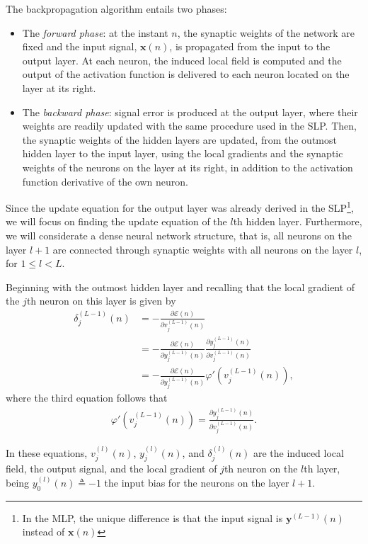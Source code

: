 \documentclass[12pt,a4paper]{article}
\begin{document}
The backpropagation algorithm entails two phases:
\begin{itemize}
    \item The \emph{forward phase}: at the instant \(n\), the synaptic weights of the network are fixed and the input signal, \(\mathbf{x}(n)\), is propagated from the input to the output layer. At each neuron, the induced local field is computed and the output of the activation function is delivered to each neuron located on the layer at its right.
    \item The \emph{backward phase}: signal error is produced at the output layer, where their weights are readily updated with the same procedure used in the SLP. Then, the synaptic weights of the hidden layers are updated, from the outmost hidden layer to the input layer, using the local gradients and the synaptic weights of the neurons on the layer at its right, in addition to the activation function derivative of the own neuron. 
\end{itemize}

Since the update equation for the output layer was already derived in the SLP\footnote{In the MLP, the unique difference is that the input signal is \(\mathbf{y}^{(L-1)}(n)\) instead of \(\mathbf{x}(n)\)}, we will focus on finding the update equation of the \(l\)th hidden layer. Furthermore, we will considerate a dense neural network structure, that is, all neurons on the layer \(l+1\) are connected through synaptic weights with all neurons on the layer \(l\), for \(1\leq l < L\).

Beginning with the outmost hidden layer and recalling that the local gradient of the \(j\)th neuron on this layer is given by
\begin{align}
    \delta_j^{(L-1)} (n) & = - \frac{\partial \mathscr{E}(n)}{\partial v_{j}^{(L-1)}(n)} \nonumber \\
    & = - \frac{\partial \mathscr{E}(n)}{\partial y_{j}^{(L-1)}(n)} \frac{\partial y_{j}^{(L-1)}(n)}{\partial v_{j}^{(L-1)}(n)} \nonumber \nonumber \\
    & = - \frac{\partial \mathscr{E}(n)}{\partial y_{j}^{(L-1)}(n)} \varphi'(v_j^{(L-1)}(n)),
    \label{eq:local-gradient2}
\end{align}
where the third equation follows that
\begin{align}
    \varphi'(v_j^{(L-1)}(n)) = \frac{\partial y_{j}^{(L-1)}(n)}{\partial v_{j}^{(L-1)}(n)}.
\end{align}

In these equations, \(v_{j}^{(l)}(n)\), \(y_{j}^{(l)} (n)\), and \(\delta_j^{(l)} (n)\) are the induced local field, the output signal, and the local gradient of \(j\)th neuron on the \(l\)th layer, being \(y_{0}^{(l)} (n) \triangleq -1\) the input bias for the neurons on the layer \(l+1\).
\end{document}
